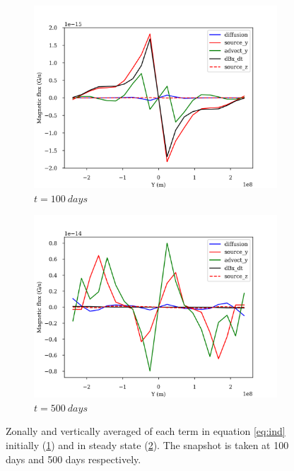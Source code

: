 \documentclass[11pt]{article}
\begin{document}
\begin{figure}
\begin{subfigure}{0.49\textwidth}
	\centering
	\includegraphics[width=\linewidth]{images/compare_YZaver_100_lg.png}
	\caption{$t = 100\ days$}
	\label{fig:Compare_t100}
\end{subfigure}
\begin{subfigure}{0.49\textwidth}
	\centering
	\includegraphics[width=\linewidth]{images/compare_YZaver_500_lg.png}
	\caption{$t = 500\ days$}
	\label{fig:Compare_t500}
\end{subfigure}
\caption{Zonally and vertically averaged of each term in equation \ref{eq:ind} initially (\ref{fig:Compare_t100}) and in steady state (\ref{fig:Compare_t500}). The snapshot is taken at 100 days and 500 days respectively.}
\label{fig:Compare}
\end{figure}
  
\end{document}
